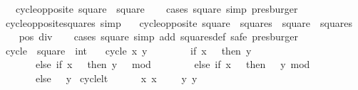 \begin{isabellebody}
\ \ \ {\isachardoublequoteopen}cycle{\isacharunderscore}opposite\ square\ {\isasymnoteq}\ square{\isachardoublequoteclose}\isanewline
%
\isadelimproof
\ \ %
\endisadelimproof
%
\isatagproof
{}\isamarkupfalse%
\ {\isacharparenleft}cases\ square{\isacharcomma}\ simp{\isacharcomma}\ presburger{\isacharparenright}%
\endisatagproof
{\isafoldproof}%
%
\isadelimproof
\isanewline
%
\endisadelimproof
\isanewline
{}\isamarkupfalse%
\ cycle{\isacharunderscore}opposite{\isacharunderscore}squares\ {\isacharbrackleft}simp{\isacharbrackright}{\isacharcolon}\isanewline
\ \ \ {\isachardoublequoteopen}cycle{\isacharunderscore}opposite\ square\ {\isasymin}\ squares\ {\isasymlongleftrightarrow}\ square\ {\isasymin}\ squares{\isachardoublequoteclose}\isanewline
%
\isadelimproof
\ \ %
\endisadelimproof
%
\isatagproof
{}\isamarkupfalse%
\ pos\ div{}\isanewline
\ \ \isamarkupfalse%
\ {\isacharparenleft}cases\ square{\isacharparenright}\ {\isacharparenleft}simp\ add{\isacharcolon}\ squares{\isacharunderscore}def{\isacharcomma}\ safe{\isacharcomma}\ presburger{\isacharplus}{\isacharparenright}%
\endisatagproof
{\isafoldproof}%
%
\isadelimproof
\isanewline
%
\endisadelimproof
\isanewline
\isanewline
{}\isamarkupfalse%
\ cycle{}\ {\isacharcolon}{\isacharcolon}\ {\isachardoublequoteopen}square\ {\isasymRightarrow}\ int{\isachardoublequoteclose}\ \isanewline
\ \ {\isachardoublequoteopen}cycle{}\ {\isacharparenleft}x{\isacharcomma}\ y{\isacharparenright}\ {\isacharequal}\ \isanewline
\ \ \ \ \ \ {\isacharparenleft}if\ x\ {\isacharequal}\ {}\ then\ y\ \isanewline
\ \ \ \ \ \ \ else\ if\ x\ {\isacharequal}\ {}\ then\ {\isacharparenleft}y\ {\isacharplus}\ {}{\isacharparenright}\ mod\ {}\isanewline
\ \ \ \ \ \ \ else\ if\ x\ {\isacharequal}\ {}\ then\ {\isacharparenleft}{}\ {\isacharminus}\ y{\isacharparenright}\ mod\ {}\isanewline
\ \ \ \ \ \ \ else\ {}\ {\isacharminus}\ y{\isacharparenright}{\isachardoublequoteclose}\isanewline
\isanewline
{}\isamarkupfalse%
\ cycle{\isacharunderscore}lt{\isacharunderscore}{}{\isacharcolon}\ \isanewline
\ \ \ {\isachardoublequoteopen}{}\ {\isasymle}\ x{\isachardoublequoteclose}\ {\isachardoublequoteopen}x\ {\isacharless}\ {}{\isachardoublequoteclose}\ {\isachardoublequoteopen}{}\ {\isasymle}\ y{\isachardoublequoteclose}\ {\isachardoublequoteopen}y\ {\isacharless}\ {}{\isachardoublequoteclose}\isanewline

\end{isabellebody}
